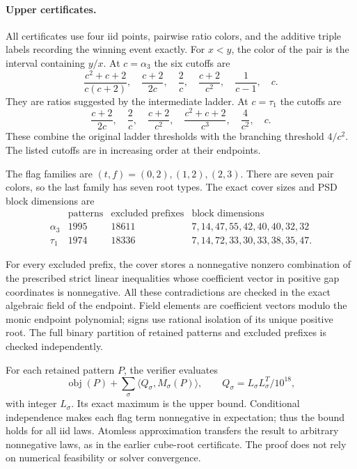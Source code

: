 \documentclass[11pt]{article}
\begin{document}
\paragraph{Upper certificates.}
All certificates use four iid points, pairwise ratio colors, and the
additive triple labels recording the winning event exactly. For $x<y$,
the color of the pair is the interval containing $y/x$. At $c=\alpha_3$
the six cutoffs are
\[
\frac{c^2+c+2}{c(c+2)},\quad
\frac{c+2}{2c},\quad \frac2c,\quad
\frac{c+2}{c^2},\quad\frac1{c-1},\quad c.
\]
They are ratios suggested by the intermediate ladder. At $c=\tau_1$
the cutoffs are
\[
\frac{c+2}{2c},\quad\frac2c,\quad\frac{c+2}{c^2},\quad
\frac{c^2+c+2}{c^3},\quad\frac4{c^2},\quad c.
\]
These combine the original ladder thresholds with the branching threshold
$4/c^2$. The listed cutoffs are in increasing order at their endpoints.

The flag families are $(t,f)=(0,2),(1,2),(2,3)$. There are seven pair
colors, so the last family has seven root types. The exact cover sizes
and PSD block dimensions are
\[
\begin{array}{c|r|r|l}
&\text{patterns}&\text{excluded prefixes}&\text{block dimensions}\\\hline
\alpha_3&1995&18611&7,14,47,55,42,40,40,32,32\\
\tau_1&1974&18336&7,14,72,33,30,33,38,35,47.
\end{array}
\]

For every excluded prefix, the cover stores a nonnegative nonzero
combination of the prescribed strict linear inequalities whose coefficient
vector in positive gap coordinates is nonnegative. All these contradictions
are checked in the exact algebraic field of the endpoint. Field elements
are coefficient vectors modulo the monic endpoint polynomial; signs use
rational isolation of its unique positive root. The full binary partition
of retained patterns and excluded prefixes is checked independently.

For each retained pattern $P$, the verifier evaluates
\[
\operatorname{obj}(P)+\sum_\sigma\langle Q_\sigma,M_\sigma(P)\rangle,
\qquad Q_\sigma=L_\sigma L_\sigma^T/10^{18},
\]
with integer $L_\sigma$. Its exact maximum is the upper bound. Conditional
independence makes each flag term nonnegative in expectation; thus the
bound holds for all iid laws. Atomless approximation transfers the result
to arbitrary nonnegative laws, as in the earlier cube-root certificate.
The proof does not rely on numerical feasibility or solver convergence.
\end{document}
